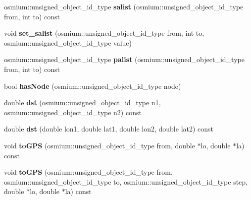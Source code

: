 \begin{DoxyCompactItemize}
\item 
\hypertarget{classjustine_1_1sampleclient_1_1ShmClient_aaa91265eefc33bb73d55989e8074b3d8}{osmium\-::unsigned\-\_\-object\-\_\-id\-\_\-type {\bfseries salist} (osmium\-::unsigned\-\_\-object\-\_\-id\-\_\-type from, int to) const }\label{classjustine_1_1sampleclient_1_1ShmClient_aaa91265eefc33bb73d55989e8074b3d8}

\item 
\hypertarget{classjustine_1_1sampleclient_1_1ShmClient_a5b2928e2dd538c5712c9302e940770f8}{void {\bfseries set\-\_\-salist} (osmium\-::unsigned\-\_\-object\-\_\-id\-\_\-type from, int to, osmium\-::unsigned\-\_\-object\-\_\-id\-\_\-type value)}\label{classjustine_1_1sampleclient_1_1ShmClient_a5b2928e2dd538c5712c9302e940770f8}

\item 
\hypertarget{classjustine_1_1sampleclient_1_1ShmClient_a88e09b87f6f91f0961821731d578397c}{osmium\-::unsigned\-\_\-object\-\_\-id\-\_\-type {\bfseries palist} (osmium\-::unsigned\-\_\-object\-\_\-id\-\_\-type from, int to) const }\label{classjustine_1_1sampleclient_1_1ShmClient_a88e09b87f6f91f0961821731d578397c}

\item 
\hypertarget{classjustine_1_1sampleclient_1_1ShmClient_a7d6d4258adcfc4753b025d3a10239bb3}{bool {\bfseries has\-Node} (osmium\-::unsigned\-\_\-object\-\_\-id\-\_\-type node)}\label{classjustine_1_1sampleclient_1_1ShmClient_a7d6d4258adcfc4753b025d3a10239bb3}

\item 
\hypertarget{classjustine_1_1sampleclient_1_1ShmClient_a81901cf4e8b7ea0ed416b7a0773d0893}{double {\bfseries dst} (osmium\-::unsigned\-\_\-object\-\_\-id\-\_\-type n1, osmium\-::unsigned\-\_\-object\-\_\-id\-\_\-type n2) const }\label{classjustine_1_1sampleclient_1_1ShmClient_a81901cf4e8b7ea0ed416b7a0773d0893}

\item 
\hypertarget{classjustine_1_1sampleclient_1_1ShmClient_ae1a1cd61d7de906362bb95a38e65cd24}{double {\bfseries dst} (double lon1, double lat1, double lon2, double lat2) const }\label{classjustine_1_1sampleclient_1_1ShmClient_ae1a1cd61d7de906362bb95a38e65cd24}

\item 
\hypertarget{classjustine_1_1sampleclient_1_1ShmClient_a4d5965a9626d92ded45dbb01c0e4ac28}{void {\bfseries to\-G\-P\-S} (osmium\-::unsigned\-\_\-object\-\_\-id\-\_\-type from, double $\ast$lo, double $\ast$la) const }\label{classjustine_1_1sampleclient_1_1ShmClient_a4d5965a9626d92ded45dbb01c0e4ac28}

\item 
\hypertarget{classjustine_1_1sampleclient_1_1ShmClient_a632e85bed10638ec836db5132fc50a54}{void {\bfseries to\-G\-P\-S} (osmium\-::unsigned\-\_\-object\-\_\-id\-\_\-type from, osmium\-::unsigned\-\_\-object\-\_\-id\-\_\-type to, osmium\-::unsigned\-\_\-object\-\_\-id\-\_\-type step, double $\ast$lo, double $\ast$la) const }\label{classjustine_1_1sampleclient_1_1ShmClient_a632e85bed10638ec836db5132fc50a54}

\end{DoxyCompactItemize}

